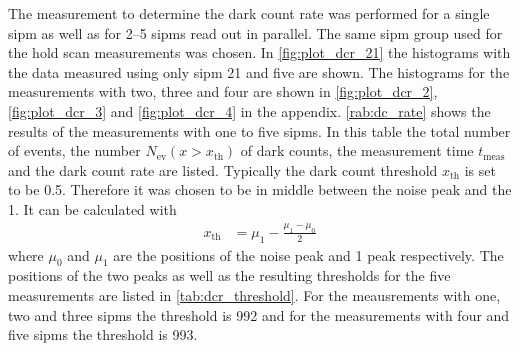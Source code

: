 The measurement to determine the dark count rate was performed for a single \ac{sipm} as well as for \numrange{2}{5} \ac{sipm}s read out in parallel.
The same \ac{sipm} group used for the hold scan measurements was chosen.
In \autoref{fig:plot_dcr_21} the histograms with the data measured using only \ac{sipm} 21 and five  are shown.
The histograms for the measurements with two, three and four  are shown in \autoref{fig:plot_dcr_2}, \autoref{fig:plot_dcr_3} and \autoref{fig:plot_dcr_4} in the appendix.
\autoref{rab:dc_rate} shows the results of the measurements with one to five \acp{sipm}.
In this table the total number of events, the number $N_\text{ev}(x>x_\text{th})$ of dark counts, the measurement time $t_\text{meas}$ and the dark count rate are listed.
Typically the dark count threshold $x_\text{th}$ is set to be \SI{0.5}{\pe}. 
Therefore it was chosen to be in middle between the noise peak and the \SI{1}{\pe}.
It can be calculated with
\begin{align}
	x_\text{th}&=\mu_1 - \frac{\mu_1-\mu_0}{2}
\end{align}
where $\mu_0$ and $\mu_1$ are the positions of the noise peak and \SI{1}{\pe} peak respectively.
The positions of the two peaks as well as the resulting thresholds for the five measurements are listed in \autoref{tab:dcr_threshold}.
For the meausrements with one, two and three \acp{sipm} the threshold is \SI{992}{\adcu} and for the measurements with four and five \acp{sipm} the threshold is \SI{993}{\adcu}.

